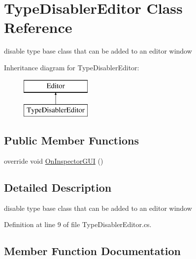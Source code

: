 \hypertarget{class_type_disabler_editor}{}\section{Type\+Disabler\+Editor Class Reference}
\label{class_type_disabler_editor}


disable type base class that can be added to an editor window  


Inheritance diagram for Type\+Disabler\+Editor\+:\begin{figure}[H]
\begin{center}
\leavevmode
\includegraphics[height=2.000000cm]{class_type_disabler_editor}
\end{center}
\end{figure}
\subsection*{Public Member Functions}
\begin{DoxyCompactItemize}
\item 
override void \mbox{\hyperlink{class_type_disabler_editor_aa4f0cb9f684897fb89aa9c2234196257}{On\+Inspector\+G\+UI}} ()
\end{DoxyCompactItemize}


\subsection{Detailed Description}
disable type base class that can be added to an editor window 



Definition at line 9 of file Type\+Disabler\+Editor.\+cs.



\subsection{Member Function Documentation}
\mbox{\label{class_type_disabler_editor_aa4f0cb9f684897fb89aa9c2234196257}} 

